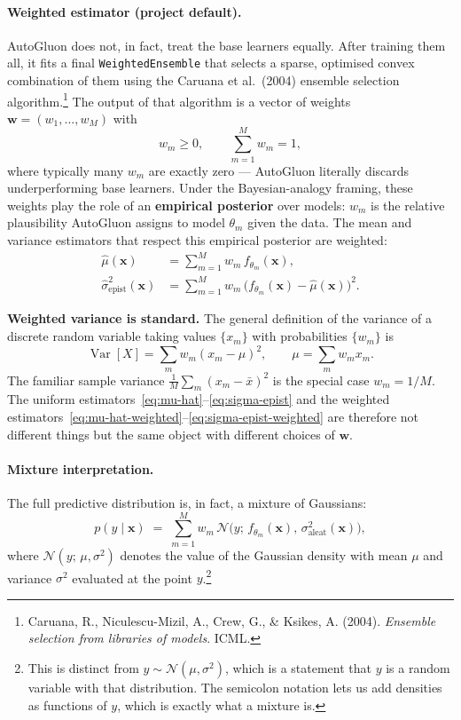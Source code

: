 \documentclass[11pt,a4paper]{article}
\DeclareMathOperator{\Var}{Var}
\begin{document}
\paragraph{Weighted estimator (project default).} AutoGluon does not, in fact, treat the base learners equally. After training them all, it fits a final \texttt{WeightedEnsemble} that selects a sparse, optimised convex combination of them using the Caruana et al.~(2004) ensemble selection algorithm.\footnote{Caruana, R., Niculescu-Mizil, A., Crew, G., \& Ksikes, A. (2004). \emph{Ensemble selection from libraries of models}. ICML.} The output of that algorithm is a vector of weights $\bm w = (w_1, \ldots, w_M)$ with
\[
w_m \geq 0, \qquad \sum_{m=1}^M w_m = 1,
\]
where typically many $w_m$ are exactly zero --- AutoGluon literally discards underperforming base learners. Under the Bayesian-analogy framing, these weights play the role of an \textbf{empirical posterior} over models: $w_m$ is the relative plausibility AutoGluon assigns to model $\theta_m$ given the data. The mean and variance estimators that respect this empirical posterior are weighted:
\begin{align}
\hat\mu(\bm x)
&= \sum_{m=1}^M w_m \, f_{\theta_m}(\bm x),
\label{eq:mu-hat-weighted}\\
\hat\sigma^2_{\text{epist}}(\bm x)
&= \sum_{m=1}^M w_m \, \big(f_{\theta_m}(\bm x) - \hat\mu(\bm x)\big)^2.
\label{eq:sigma-epist-weighted}
\end{align}

\begin{recapbox}
\textbf{Weighted variance is standard.} The general definition of the variance of a discrete random variable taking values $\{x_m\}$ with probabilities $\{w_m\}$ is
\[
\Var[X] = \sum_m w_m (x_m - \mu)^2, \qquad \mu = \sum_m w_m x_m.
\]
The familiar sample variance $\frac{1}{M}\sum_m (x_m - \bar x)^2$ is the special case $w_m = 1/M$. The uniform estimators~\eqref{eq:mu-hat}--\eqref{eq:sigma-epist} and the weighted estimators~\eqref{eq:mu-hat-weighted}--\eqref{eq:sigma-epist-weighted} are therefore not different things but the same object with different choices of $\bm w$.
\end{recapbox}

\paragraph{Mixture interpretation.} The full predictive distribution is, in fact, a mixture of Gaussians:
\[
p(y \mid \bm x) \;=\; \sum_{m=1}^M w_m \, \mathcal{N}\!\big(y;\, f_{\theta_m}(\bm x),\, \sigma^2_{\text{aleat}}(\bm x)\big),
\]
where $\mathcal{N}(y;\, \mu, \sigma^2)$ denotes the value of the Gaussian density with mean $\mu$ and variance $\sigma^2$ evaluated at the point $y$.\footnote{This is distinct from $y \sim \mathcal{N}(\mu, \sigma^2)$, which is a statement that $y$ is a random variable with that distribution. The semicolon notation lets us add densities as functions of $y$, which is exactly what a mixture is.}
\end{document}
